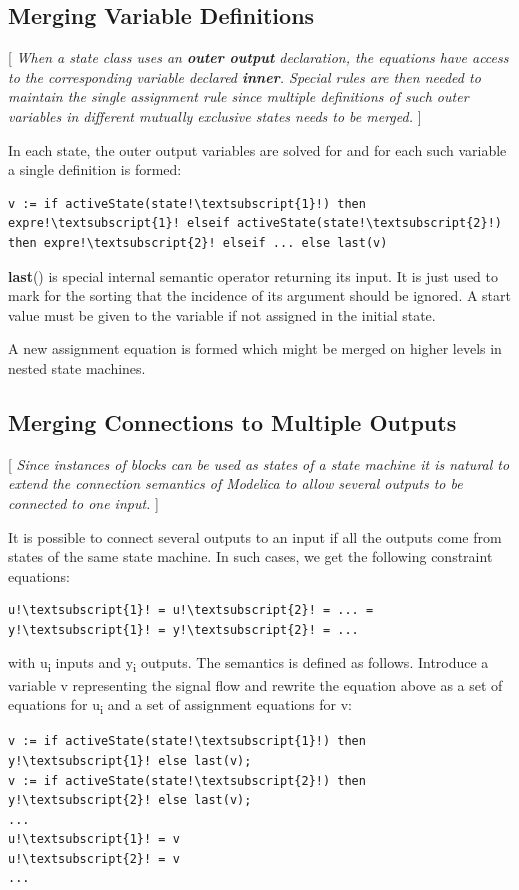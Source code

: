 \documentclass[10pt,a4paper]{report}
\def\doublelabel#1{\label{#1}}
\begin{document}
\subsection{Merging Variable Definitions}\doublelabel{merging-variable-definitions}

{[} \emph{When a state class uses an \textbf{outer output} declaration,
the equations have access to the corresponding variable declared
\textbf{inner}. Special rules are then needed to maintain the single
assignment rule since multiple definitions of such outer variables in
different mutually exclusive states needs to be merged.} {]}

In each state, the outer output variables are solved for and for each
such variable a single definition is formed:

\begin{lstlisting}[language=modelica,escapechar=!]
v := if activeState(state!\textsubscript{1}!) then expre!\textsubscript{1}! elseif activeState(state!\textsubscript{2}!) then expre!\textsubscript{2}! elseif ... else last(v)
\end{lstlisting}

\textbf{last}() is special internal semantic operator returning its
input. It is just used to mark for the sorting that the incidence of its
argument should be ignored. A start value must be given to the variable
if not assigned in the initial state.

A new assignment equation is formed which might be merged on higher
levels in nested state machines.

\subsection{Merging Connections to Multiple Outputs}\doublelabel{merging-connections-to-multiple-outputs}

{[} \emph{Since instances of blocks can be used as states of a state
machine it is natural to extend the connection semantics of Modelica to
allow several outputs to be connected to one input.} {]}

It is possible to connect several outputs to an input if all the outputs
come from states of the same state machine. In such cases, we get the
following constraint equations:

\begin{lstlisting}[language=modelica,escapechar=!]
u!\textsubscript{1}! = u!\textsubscript{2}! = ... = y!\textsubscript{1}! = y!\textsubscript{2}! = ...
\end{lstlisting}
with u\textsubscript{i} inputs and y\textsubscript{i} outputs. The
semantics is defined as follows. Introduce a variable v representing the
signal flow and rewrite the equation above as a set of equations for
u\textsubscript{i} and a set of assignment equations for v:
\begin{lstlisting}[language=modelica,escapechar=!]
v := if activeState(state!\textsubscript{1}!) then y!\textsubscript{1}! else last(v);
v := if activeState(state!\textsubscript{2}!) then y!\textsubscript{2}! else last(v);
...
u!\textsubscript{1}! = v
u!\textsubscript{2}! = v
...
\end{lstlisting}
\end{document}
